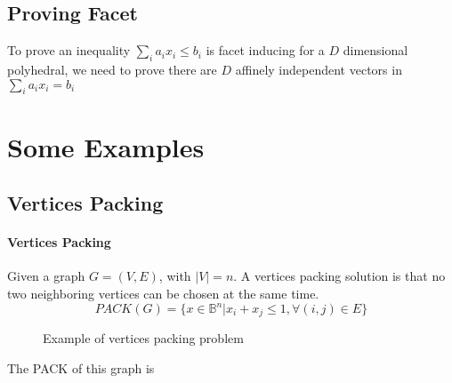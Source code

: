         \subsection{Proving Facet}
            To prove an inequality $\sum_i a_i x_i \le b_i$ is facet inducing for a $D$ dimensional polyhedral, we need to prove there are $D$ affinely independent vectors in $\sum_i a_i x_i = b_i$

    \section{Some Examples}
        \subsection{Vertices Packing}
            \paragraph{Vertices Packing}
                Given a graph $G=(V, E)$, with $|V|=n$. A vertices packing solution is that no two neighboring vertices can be chosen at the same time.
                \begin{equation*}
                    PACK(G) = \{x\in \mathbb{B}^n|x_i + x_j \le 1, \forall (i, j)\in E\} \nonumber
                \end{equation*}

                \begin{figure}[!ht]
                    \centering
                    \caption{Example of vertices packing problem}
                \end{figure}

                The PACK of this graph is


